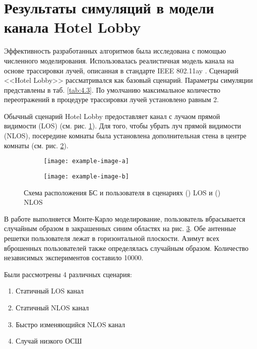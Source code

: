 \section{Результаты симуляций в модели канала Hotel Lobby}
Эффективность разработанных алгоритмов была исследована с помощью численного
моделирования. Использовалась реалистичная модель канала на основе трассировки
лучей, описанная в стандарте IEEE 802.11ay  \cite{Maltsev2017}. Сценарий 
<<Hotel Lobby>> рассматривался как базовый сценарий. 
Параметры симуляции представлены в таб. \ref{tab:4.3}. 
По умолчанию максимальное количество переотражений в процедуре
трассировки лучей установлено равным 2.  

Обычный сценарий Hotel Lobby предоставляет канал с лучаом прямой видимости (LOS)
(см. рис. \ref{fig:4.30a}). Для того, чтобы убрать луч прямой видимости (NLOS),
посередине комнаты была установлена дополнительная стена в центре комнаты
(см. рис. \ref{fig:4.30b}).

\begin{figure}[ht]
    \centering
    \begin{subfigure}{0.49\linewidth}
        \centering   
        \texttt{[image: example-image-a]}
        \caption{}
        \label{fig:4.30a}
    \end{subfigure}
    \begin{subfigure}{0.49\linewidth}
        \centering   
        \texttt{[image: example-image-b]}
        \caption{}
        \label{fig:4.30b}
    \end{subfigure}
    \caption{Схема расположения БС и пользователя в сценариях () LOS
    и () NLOS}
    \label{fig:4.30}
\end{figure}



В работе выполняется  Монте-Карло моделирование, пользователь вбрасывается 
случайным образом в закрашенных синим областях на рис. \ref{fig:4.30}. 
Обе антенные решетки пользователя лежат в горизонтальной плоскости. 
Азимут всех вброшенных пользователей также определялась случайным образом. 
Количество независимых экспериментов составило 10000.

Были рассмотрены 4 различных сценария:
\begin{enumerate}
    \item Статичный LOS канал 
    \item Статичный NLOS канал
    \item Быстро изменяющийся NLOS канал 
    \item Случай низкого ОСШ
\end{enumerate}

